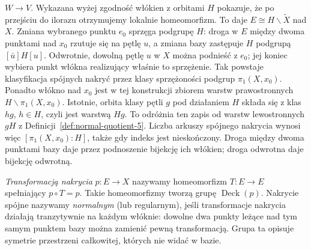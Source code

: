 \begin{uwaga}
$W\to V$. Wykazana wyżej zgodność włókien z orbitami
$H$ pokazuje, że po przejściu do ilorazu otrzymujemy
lokalnie homeomorfizm. To daje
$E\cong H\backslash\widetilde X$
nad $X$. Zmiana wybranego punktu
$e_0$ sprzęga podgrupę $H$: droga w $E$ między dwoma punktami
nad $x_0$ rzutuje się na pętlę $u$, a zmiana bazy zastępuje
$H$ podgrupą $[\bar u]H[u]$.
Odwrotnie, dowolną pętlę $u$ w $X$ można podnieść z $e_0$;
jej koniec wybiera punkt włókna realizujący właśnie to sprzężenie.
Tak powstaje klasyfikacja spójnych
nakryć przez klasy sprzężoności
podgrup $\pi_1(X,x_0)$.
Ponadto włókno nad $x_0$ jest w tej konstrukcji
zbiorem warstw prawostronnych $H\backslash\pi_1(X,x_0)$.
Istotnie, orbita klasy pętli $g$ pod działaniem $H$
składa się z klas $hg$, $h\in H$, czyli jest warstwą $Hg$.
To odróżnia ten zapis od warstw lewostronnych $gH$
z Definicji~\ref{def:normal-quotient-5}.
Liczba arkuszy spójnego nakrycia wynosi więc
$[\pi_1(X,x_0):H]$, także gdy indeks jest nieskończony.
Droga między dwoma punktami bazy daje przez podnoszenie
bijekcję ich włókien; droga odwrotna daje bijekcję odwrotną.
\end{uwaga}

\begin{definicja}
\label{def:transformacja-nakrycia}
\emph{Transformacją nakrycia} $p:E\to X$ nazywamy
homeomorfizm $T:E\to E$ spełniający $p\circ T=p$.
Takie homeomorfizmy tworzą grupę $\operatorname{Deck}(p)$.
Nakrycie spójne nazywamy \emph{normalnym} (lub regularnym),
jeśli transformacje nakrycia działają tranzytywnie na każdym
włóknie: dowolne dwa punkty leżące nad tym samym punktem
bazy można zamienić pewną transformacją. Grupa ta opisuje
symetrie przestrzeni całkowitej, których nie widać w bazie.
\end{definicja}

